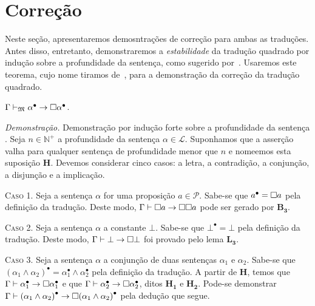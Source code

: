 \section{Correção}

    Neste seção, apresentaremos demosntrações de correção para ambas as traduções.
    Antes disso, entretanto, demonstraremos a \emph{estabilidade} da tradução quadrado por indução sobre a profundidade da sentença, como sugerido por~\cite{Troelstra+Schwichtenberg.2000}.
    Usaremos este teorema, cujo nome tiramos de~\cite{Flagg+Friedman.1986}, para a demonstração da correção da tradução quadrado.

    \vspace{.5\baselineskip}
    \begin{tcolorbox}[enhanced jigsaw, breakable, sharp corners, colframe=black, colback=white, boxrule=0.5pt, left=1.5mm, right=1.5mm, top=1.5mm, bottom=1.5mm]
    \begin{theorem}[Estabilidade]\label{stability}
        $\Gamma\mathrel{\vdash}_\mathfrak{M}\alpha^\bullet\to\Box\alpha^\bullet$.
    \end{theorem}

            \emph{Demonstração.} Demonstração por indução forte sobre a profundidade da sentença \citep{Troelstra+Schwichtenberg.2000}.
            Seja $n\in\mathbb{N}^+$ a profundidade da sentença $\alpha\in\mathcal{L}$.
            Suponhamos que a asserção valha para qualquer sentença de profundidade menor que $n$ e nomeemos esta suposição $\mathbf{H}$.
            Devemos considerar cinco casos: a letra, a contradição, a conjunção, a disjunção e a implicação.

            \vspace{.5\baselineskip}
            \textsc{Caso 1.}
            Seja a sentença $\alpha$ for uma proposição $a\in\mathcal{P}$.
            Sabe-se que $a^\bullet=\Box a$ pela definição da tradução.
            Deste modo, $\Gamma\vdash\Box{a}\to\Box\Box{a}$ pode ser gerado por \hyperref[modal.axiom.modal.3]{$\mathbf{B_3}$}.

            \vspace{.5\baselineskip}
            \textsc{Caso 2.}
            Seja a sentença $\alpha$ a constante $\bot$.
            Sabe-se que $\bot^\bullet=\bot$ pela definição da tradução.
            Deste modo, $\Gamma\mathrel{\vdash}\bot\to\Box\bot$ foi provado pelo lema \hyperref[explosion]{$\mathbf{L_3}$}.

            \vspace{.5\baselineskip}
            \textsc{Caso 3.}
            Seja a sentença $\alpha$ a conjunção de duas sentenças $\alpha_1$ e $\alpha_2$.
            Sabe-se que ${(\alpha_1\wedge\alpha_2)}^\bullet=\alpha_1^\bullet\wedge\alpha_2^\bullet$ pela definição da tradução.
            A partir de $\mathbf{H}$, temos que $\Gamma\mathrel{\vdash}\alpha_1^\bullet\to\Box\alpha_1^\bullet$ e que $\Gamma\mathrel{\vdash}\alpha_2^\bullet\to\Box\alpha_2^\bullet$, ditos $\mathbf{H_1}$ e $\mathbf{H_2}$.
            Pode-se demonstrar $\Gamma\vdash{(\alpha_1\wedge\alpha_2)}^\bullet\to\Box{(\alpha_1\wedge\alpha_2)}^\bullet$ pela dedução que segue.


\end{tcolorbox}
